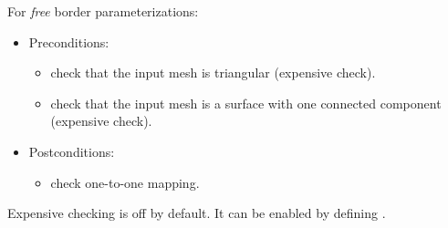 For \emph{free} border parameterizations:
\begin{itemize}
\item Preconditions:
    \begin{itemize}
    \item check that the input mesh is triangular (expensive check).
    \item check that the input mesh is a surface with one connected component (expensive check).
    \end{itemize}
\item Postconditions:
    \begin{itemize}
    \item check one-to-one mapping.
    \end{itemize}
\end{itemize}

Expensive checking is off by default. It can be enabled by
defining .


